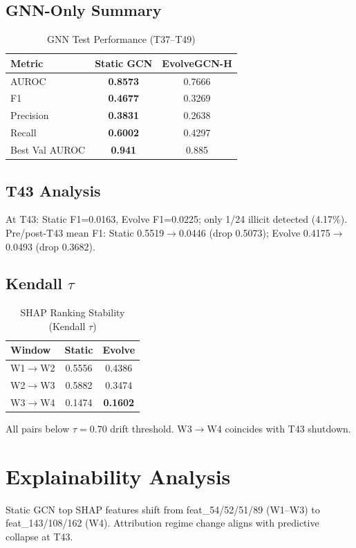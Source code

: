 \documentclass[conference]{IEEEtran}
\begin{document}
\subsection{GNN-Only Summary}
\begin{table}[htbp]
\caption{GNN Test Performance (T37--T49)}
\label{tab:aggregate}
\centering
\begin{tabular}{lcc}
\toprule
\textbf{Metric} & \textbf{Static GCN} & \textbf{EvolveGCN-H} \\
\midrule
AUROC & \textbf{0.8573} & 0.7666 \\
F1 & \textbf{0.4677} & 0.3269 \\
Precision & \textbf{0.3831} & 0.2638 \\
Recall & \textbf{0.6002} & 0.4297 \\
Best Val AUROC & \textbf{0.941} & 0.885 \\
\bottomrule
\end{tabular}
\end{table}

\subsection{T43 Analysis}
At T43: Static F1=0.0163, Evolve F1=0.0225; only 1/24 illicit detected (4.17\%). Pre/post-T43 mean F1: Static 0.5519$\rightarrow$0.0446 (drop 0.5073); Evolve 0.4175$\rightarrow$0.0493 (drop 0.3682).

\subsection{Kendall $\tau$}
\begin{table}[htbp]
\caption{SHAP Ranking Stability (Kendall $\tau$)}
\label{tab:tau}
\centering
\begin{tabular}{lcc}
\toprule
\textbf{Window} & \textbf{Static} & \textbf{Evolve} \\
\midrule
W1$\rightarrow$W2 & 0.5556 & 0.4386 \\
W2$\rightarrow$W3 & 0.5882 & 0.3474 \\
W3$\rightarrow$W4 & 0.1474 & \textbf{0.1602} \\
\bottomrule
\end{tabular}
\end{table}

All pairs below $\tau=0.70$ drift threshold. W3$\rightarrow$W4 coincides with T43 shutdown.

\section{Explainability Analysis}
Static GCN top SHAP features shift from feat\_54/52/51/89 (W1--W3) to feat\_143/108/162 (W4). Attribution regime change aligns with predictive collapse at T43.
\end{document}
